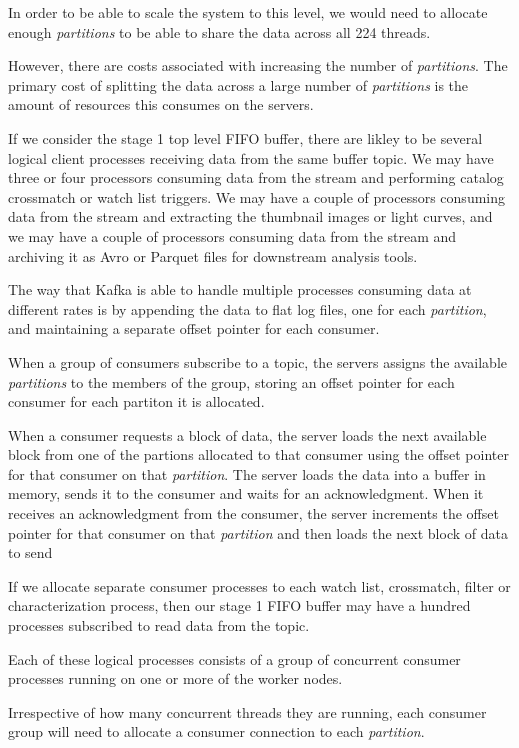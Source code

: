 \documentclass{article}
\newcommand{\kfpartition} {\textit{partition}\xspace}
\newcommand{\kfpartitions} {\textit{partitions}\xspace}
\newcommand{\crossmatch} {crossmatch\xspace}
\begin{document}
In order to be able to scale the system to this level, we would need to allocate enough \kfpartitions
to be able to share the data across all 224 threads.

However, there are costs associated with increasing the number of \kfpartitions.
The primary cost of splitting the data across a large number of \kfpartitions is the amount of resources this consumes on the servers.

If we consider the stage 1 top level FIFO buffer, there are likley to be several logical client processes
receiving data from the same buffer topic.
We may have three or four processors consuming data from the stream and performing catalog \crossmatch or
watch list triggers.
We may have a couple of processors consuming data from the stream and extracting the thumbnail images or light curves, and we may have a couple of processors consuming data from the stream and archiving it as Avro or Parquet files for downstream analysis tools.

The way that Kafka is able to handle multiple processes consuming data at different rates is by appending the data to flat log files, one for each \kfpartition, and maintaining a separate offset pointer for each consumer.

When a group of consumers subscribe to a topic, the servers assigns the available \kfpartitions to the members of the group, storing an offset pointer for each consumer for each partiton it is allocated.

When a consumer requests a block of data, the server loads the next available block from one of the partions allocated to that consumer using the offset pointer for that consumer on that \kfpartition.
The server loads the data into a buffer in memory, sends it to the consumer and waits for an acknowledgment.
When it receives an acknowledgment from the consumer, the server increments the offset pointer for that consumer on that \kfpartition and then loads the next block of data to send

If we allocate separate consumer processes to each watch list, \crossmatch, filter or characterization process, then our stage 1 FIFO buffer may have a hundred processes subscribed to read data from the topic.

Each of these logical processes consists of a group of concurrent consumer processes running on one or more of the worker nodes.

Irrespective of how many concurrent threads they are running, each consumer group will need to allocate a consumer connection to each \kfpartition.
\end{document}

